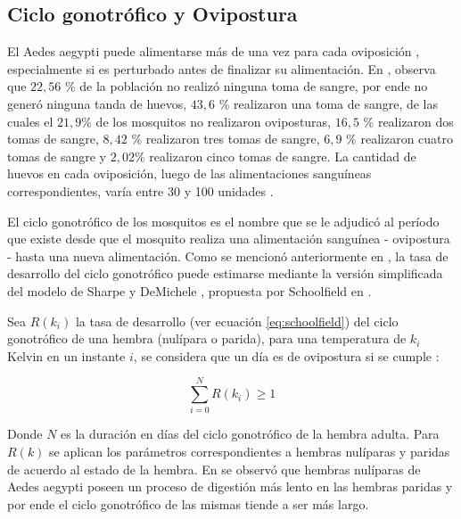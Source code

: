 \subsection{Ciclo gonotrófico y Ovipostura}
\label{subsec:cap4-ciclo-gontrofico-ovipostura}
El Aedes aegypti puede alimentarse más de una vez para cada oviposición \cite{scott1993detection},
especialmente si es perturbado antes de finalizar su alimentación. En \cite{osoriopontificia},
observa que  $22,56$ \% de la población no realizó ninguna toma de sangre, por ende no generó
ninguna tanda de huevos, $43,6$ \% realizaron una toma de sangre, de las cuales el $21,9$\% de los
mosquitos no realizaron oviposturas, $16,5$ \% realizaron dos tomas de sangre, $8,42$ \% realizaron
tres tomas de sangre, $6,9$ \% realizaron cuatro tomas de sangre y $2,02 $\% realizaron cinco tomas
de sangre. La cantidad de huevos en cada oviposición, luego de las alimentaciones sanguíneas
correspondientes, varía entre 30 y 100 unidades \cite{luevano1993ciclo, beltran2001bionomia,cabezas2005dengue}.

El ciclo gonotrófico de los mosquitos es el nombre que se le adjudicó al período que existe desde
que el mosquito realiza una alimentación sanguínea - ovipostura - hasta una nueva alimentación.
Como se mencionó anteriormente en , la tasa de desarrollo
del ciclo gonotrófico puede estimarse mediante la versión simplificada del modelo de Sharpe y DeMichele \cite{sharpe1977reaction}, propuesta por Schoolfield en \cite{schoolfield1981non}.

Sea $R(k_{i})$ la tasa de desarrollo (ver ecuación \eqref{eq:schoolfield}) del ciclo gonotrófico
de una hembra (nulípara o parida), para una temperatura de $k_{i}$ Kelvin en un instante $i$, se
considera que un día es de ovipostura si se cumple :

\begin{equation}
\label{eq:ciclo-gonotrofico-ovipostura}
    \sum_{i=0}^{N} R(k_{i}) \geq 1
\end{equation}

Donde $N$ es la duración en días del ciclo gonotrófico de la hembra adulta. Para $R(k)$ se aplican
los parámetros correspondientes a hembras nulíparas y paridas de acuerdo al estado de la hembra.
En \cite{edman1987host} se observó que hembras nulíparas de Aedes aegypti poseen un proceso de
digestión más lento en las hembras paridas y por ende el ciclo gonotrófico de las mismas tiende
a ser más largo.
